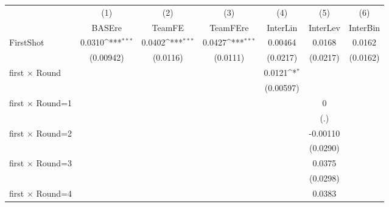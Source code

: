 {
\def\sym#1{\ifmmode^{#1}\else\(^{#1}\)\fi}
\begin{tabular}{l*{6}{c}}
\hline\hline
                    &\multicolumn{1}{c}{(1)}&\multicolumn{1}{c}{(2)}&\multicolumn{1}{c}{(3)}&\multicolumn{1}{c}{(4)}&\multicolumn{1}{c}{(5)}&\multicolumn{1}{c}{(6)}\\
                    &\multicolumn{1}{c}{BASEre}&\multicolumn{1}{c}{TeamFE}&\multicolumn{1}{c}{TeamFEre}&\multicolumn{1}{c}{InterLin}&\multicolumn{1}{c}{InterLev}&\multicolumn{1}{c}{InterBin}\\
\hline
FirstShot           &      0.0310\sym{***}&      0.0402\sym{***}&      0.0427\sym{***}&     0.00464         &      0.0168         &      0.0162         \\
                    &   (0.00942)         &    (0.0116)         &    (0.0111)         &    (0.0217)         &    (0.0217)         &    (0.0162)         \\
[1em]
first $\times$ Round&                     &                     &                     &      0.0121\sym{*}  &                     &                     \\
                    &                     &                     &                     &   (0.00597)         &                     &                     \\
[1em]
first $\times$ Round=1&                     &                     &                     &                     &           0         &                     \\
                    &                     &                     &                     &                     &         (.)         &                     \\
[1em]
first $\times$ Round=2&                     &                     &                     &                     &    -0.00110         &                     \\
                    &                     &                     &                     &                     &    (0.0290)         &                     \\
[1em]
first $\times$ Round=3&                     &                     &                     &                     &      0.0375         &                     \\
                    &                     &                     &                     &                     &    (0.0298)         &                     \\
[1em]
first $\times$ Round=4&                     &                     &                     &                     &      0.0383         &                     \\

\end{tabular}}
